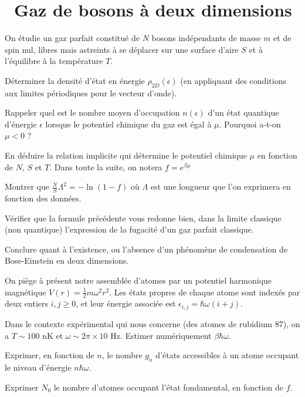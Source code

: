 \documentclass[utf8, 11pt]{feuille}
\begin{document}




\section{\medium~Gaz de bosons à deux dimensions}

On étudie un gaz parfait constitué de $N$ bosons indépendants de masse $m$ et de spin nul, libres mais astreints à se déplacer sur une surface d'aire $S$ et à l'équilibre à la température $T$.

\question
Déterminer la densité d'état en énergie $\rho_{2D}(\epsilon)$ (en appliquant des conditions aux limites périodiques pour le vecteur d'onde). 

\question
Rappeler quel est le nombre moyen d'occupation $n(\epsilon)$ d'un état quantique d'énergie $\epsilon$ lorsque le potentiel chimique du gaz est égal à $\mu$. Pourquoi a-t-on $\mu<0$ ?

\question
En déduire la relation implicite qui détermine le potentiel chimique $\mu$ en fonction de $N$, $S$ et $T$. Dans toute la suite, on notera $f=e^{\beta \mu}$

\question
Montrer que $\frac{N}{S}\Lambda^2=-\ln (1-f)$ où $\Lambda$ est une longueur que l'on exprimera en fonction des données.

\question
Vérifier que la formule précédente vous redonne bien, dans la limite classique (non quantique)
l'expression de la fugacité d'un gaz parfait classique.

\question
Conclure quant à l'existence, ou l'absence d'un phénomène de condensation de Bose-Einstein en deux dimensions.

\medskip

On piège à présent notre assemblée d'atomes par un potentiel harmonique magnétique $V(r)=\frac{1}{2}m\omega^2 r^2$. Les états propres de chaque atome sont indexés par deux entiers $i, j \geq 0$, et leur énergie associée est $\epsilon_{i,j} = \hbar \omega (i + j)$. 

\question
Dans le contexte expérimental qui nous concerne (des atomes de rubidium 87), on a  $T \sim 100$ nK et $\omega \sim 2\pi \times 10$ Hz. Estimer numériquement $\beta \hbar \omega$.

\question
Exprimer, en fonction de $n$, le nombre $g_n$ d'états accessibles à un atome
occupant le niveau d'énergie $n \hbar \omega$.

\question
Exprimer $N_0$ le nombre d'atomes occupant l'état fondamental, en fonction de $f$.
\end{document}
